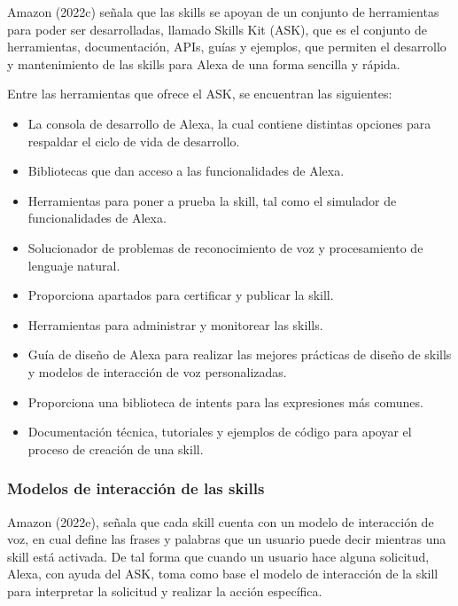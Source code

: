 Amazon (2022c) señala que las skills se apoyan de un conjunto de herramientas para poder ser desarrolladas, llamado Skills Kit (ASK), que es el conjunto de herramientas, documentación, APIs, guías y ejemplos, que permiten el desarrollo y mantenimiento de las skills para Alexa de una forma sencilla y rápida.

Entre las herramientas que ofrece el ASK, se encuentran las siguientes:

\begin{itemize}
  \item La consola de desarrollo de Alexa, la cual contiene distintas opciones para respaldar el ciclo de vida de desarrollo.
  \item Bibliotecas que dan acceso a las funcionalidades de Alexa.
  \item Herramientas para poner a prueba la skill, tal como el simulador de funcionalidades de Alexa.
  \item Solucionador de problemas de reconocimiento de voz y procesamiento de lenguaje natural.
  \item Proporciona apartados para certificar y publicar la skill.
  \item Herramientas para administrar y monitorear las skills.
  \item Guía de diseño de Alexa para realizar las mejores prácticas de diseño de skills y modelos de interacción de voz personalizadas.
  \item Proporciona una biblioteca de intents para las expresiones más comunes.
  \item Documentación técnica, tutoriales y ejemplos de código para apoyar el proceso de creación de una skill.
\end{itemize}


\subsubsection{Modelos de interacción de las skills}
\label{ModelosInteraccioncapIV}

Amazon (2022e), señala que cada skill cuenta con un modelo de interacción de voz, en cual define las frases y palabras que un usuario puede decir mientras una skill está activada. De tal forma que cuando un usuario hace alguna solicitud, Alexa, con ayuda del ASK, toma como base el modelo de interacción de la skill para interpretar la solicitud y realizar la acción específica.

